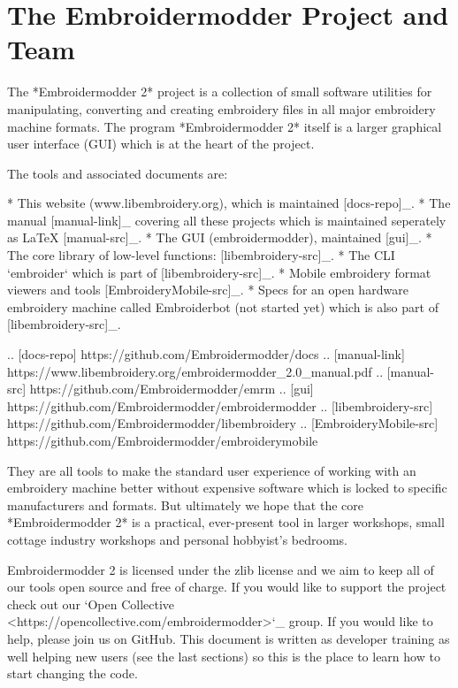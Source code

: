 \section{The Embroidermodder Project and Team}

The *Embroidermodder 2* project is a collection of small software utilities for
manipulating, converting and creating embroidery files in all major embroidery
machine formats. The program *Embroidermodder 2* itself is a larger graphical
user interface (GUI) which is at the heart of the project.

The tools and associated documents are:

* This website (www.libembroidery.org), which is maintained [docs-repo]_.
* The manual [manual-link]_ covering all these projects which is maintained seperately as LaTeX [manual-src]_.
* The GUI (embroidermodder), maintained [gui]_.
* The core library of low-level functions: [libembroidery-src]_.
* The CLI `embroider` which is part of [libembroidery-src]_.
* Mobile embroidery format viewers and tools [EmbroideryMobile-src]_.
* Specs for an open hardware embroidery machine called Embroiderbot (not started yet) which is also part of [libembroidery-src]_.

.. [docs-repo] https://github.com/Embroidermodder/docs
.. [manual-link] https://www.libembroidery.org/embroidermodder_2.0_manual.pdf
.. [manual-src] https://github.com/Embroidermodder/emrm
.. [gui] https://github.com/Embroidermodder/embroidermodder
.. [libembroidery-src] https://github.com/Embroidermodder/libembroidery
.. [EmbroideryMobile-src] https://github.com/Embroidermodder/embroiderymobile

They are all tools to make the standard user experience of working with an
embroidery machine better without expensive software which is locked to specific
manufacturers and formats. But ultimately we hope that the core *Embroidermodder 2*
is a practical, ever-present tool in larger workshops, small cottage industry workshops
and personal hobbyist's bedrooms.

Embroidermodder 2 is licensed under the zlib license and we aim to keep all of
our tools open source and free of charge. If you would like to support the
project check out our `Open Collective <https://opencollective.com/embroidermodder>`_
group. If you would like to help, please
join us on GitHub. This document is written as developer training as well
helping new users (see the last sections) so this is the place to learn how
to start changing the code.

